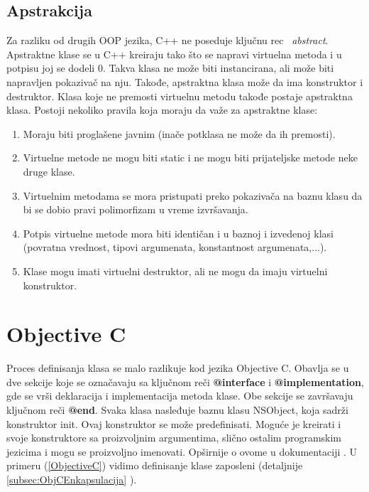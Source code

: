 \documentclass[a4paper]{article}
\begin{document}
{\subsection{Apstrakcija}
\label{subsec:c++Apstrakcija}
Za razliku od drugih OOP jezika, C++ ne poseduje ključnu rec ~{\em abstract}. Apstraktne klase se u C++ kreiraju tako što se napravi virtuelna metoda i u potpisu joj se dodeli 0. Takva klasa ne može biti instancirana, ali može biti napravljen pokazivač na nju. Takođe, apstraktna klasa može da ima konstruktor i destruktor. Klasa koje ne premosti virtuelnu metodu takođe postaje apstraktna klasa. Postoji nekoliko pravila koja moraju da važe za apstraktne klase:
\begin{enumerate}
	\item Moraju biti proglašene javnim (inače potklasa ne može da ih premosti).
	\item Virtuelne metode ne mogu biti static i ne mogu biti prijateljske metode neke druge klase.
	\item Virtuelnim metodama se mora pristupati preko pokazivača na baznu klasu da bi se dobio pravi polimorfizam u vreme izvršavanja.
	\item Potpis virtuelne metode mora biti identičan i u baznoj i izvedenoj klasi (povratna vrednost, tipovi argumenata, konstantnost argumenata,...).
	\item Klase mogu imati virtuelni destruktor, ali ne mogu da imaju virtuelni konstruktor.
\end{enumerate}

\section{Objective C}
\label{sec:ObjectiveC}

Proces definisanja klasa se malo razlikuje kod jezika Objective C. Obavlja se u dve sekcije koje se označavaju sa ključnom reči \textbf{@interface} i \textbf{@implementation}, gde se vrši deklaracija i implementacija metoda klase. Obe sekcije se završavaju ključnom reči \textbf{@end}. Svaka klasa nasleđuje baznu klasu NSObject, koja sadrži konstruktor init. Ovaj konstruktor se može predefinisati. Moguće je kreirati i svoje konstruktore sa proizvoljnim argumentima, slično ostalim programskim jezicima i mogu se proizvoljno imenovati. Opširnije o ovome u dokumentaciji \cite{ObjectiveCdoc}. U primeru (\ref{ObjectiveC}) vidimo definisanje klase zaposleni (detaljnije \ref{subsec:ObjCEnkapsulacija} ).

}
\end{document}
